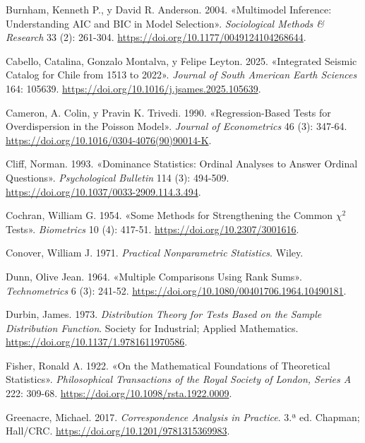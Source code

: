 \documentclass[
  spanish,
  letterpaper,
  DIV=11,
  numbers=noendperiod]{scrartcl}
\newlength{\cslhangindent}
\newenvironment{CSLReferences}[2] %
 {\begin{list}{}{%
  \setlength{\itemindent}{0pt}
  \setlength{\leftmargin}{0pt}
  \setlength{\parsep}{0pt}
  \ifodd #1
   \setlength{\leftmargin}{\cslhangindent}
   \setlength{\itemindent}{-1\cslhangindent}
  \fi
  \setlength{\itemsep}{#2\baselineskip}}}
 {\end{list}}
\begin{document}
\begin{CSLReferences}{1}{1}
Burnham, Kenneth P., y David R. Anderson. 2004. {«Multimodel Inference:
Understanding {AIC} and {BIC} in Model Selection»}. \emph{Sociological
Methods \& Research} 33 (2): 261-304.
\url{https://doi.org/10.1177/0049124104268644}.

Cabello, Catalina, Gonzalo Montalva, y Felipe Leyton. 2025. {«Integrated
Seismic Catalog for Chile from 1513 to 2022»}. \emph{Journal of South
American Earth Sciences} 164: 105639.
\url{https://doi.org/10.1016/j.jsames.2025.105639}.

Cameron, A. Colin, y Pravin K. Trivedi. 1990. {«Regression-Based Tests
for Overdispersion in the Poisson Model»}. \emph{Journal of
Econometrics} 46 (3): 347-64.
\url{https://doi.org/10.1016/0304-4076(90)90014-K}.

Cliff, Norman. 1993. {«Dominance Statistics: Ordinal Analyses to Answer
Ordinal Questions»}. \emph{Psychological Bulletin} 114 (3): 494-509.
\url{https://doi.org/10.1037/0033-2909.114.3.494}.

Cochran, William G. 1954. {«Some Methods for Strengthening the Common
{\(\chi^2\)} Tests»}. \emph{Biometrics} 10 (4): 417-51.
\url{https://doi.org/10.2307/3001616}.

Conover, William J. 1971. \emph{Practical Nonparametric Statistics}.
Wiley.

Dunn, Olive Jean. 1964. {«Multiple Comparisons Using Rank Sums»}.
\emph{Technometrics} 6 (3): 241-52.
\url{https://doi.org/10.1080/00401706.1964.10490181}.

Durbin, James. 1973. \emph{Distribution Theory for Tests Based on the
Sample Distribution Function}. Society for Industrial; Applied
Mathematics. \url{https://doi.org/10.1137/1.9781611970586}.

Fisher, Ronald A. 1922. {«On the Mathematical Foundations of Theoretical
Statistics»}. \emph{Philosophical Transactions of the Royal Society of
London, Series A} 222: 309-68.
\url{https://doi.org/10.1098/rsta.1922.0009}.

Greenacre, Michael. 2017. \emph{Correspondence Analysis in Practice}.
3.ª ed. Chapman; Hall/CRC. \url{https://doi.org/10.1201/9781315369983}.


\end{CSLReferences}
\end{document}
